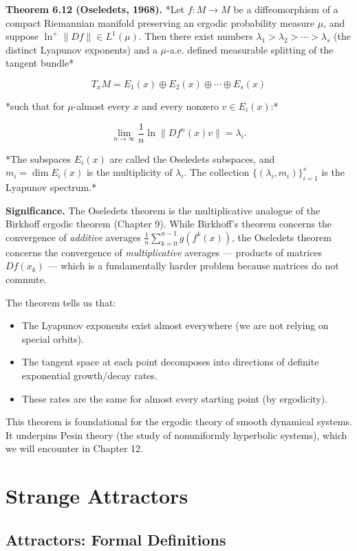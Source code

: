 \textbf{Theorem 6.12 (Oseledets, 1968).} *Let $f: M \to M$ be a diffeomorphism of a compact Riemannian manifold preserving an ergodic probability measure $\mu$, and suppose $\ln^+ \|Df\| \in L^1(\mu)$. Then there exist numbers $\lambda_1 > \lambda_2 > \cdots > \lambda_s$ (the distinct Lyapunov exponents) and a $\mu$-a.e. defined measurable splitting of the tangent bundle*

\[
T_x M = E_1(x) \oplus E_2(x) \oplus \cdots \oplus E_s(x)
\]

*such that for $\mu$-almost every $x$ and every nonzero $v \in E_i(x)$:*

\[
\lim_{n \to \infty} \frac{1}{n} \ln \|Df^n(x) v\| = \lambda_i.
\]

*The subspaces $E_i(x)$ are called the Oseledets subspaces, and $m_i = \dim E_i(x)$ is the multiplicity of $\lambda_i$. The collection $\{(\lambda_i, m_i)\}_{i=1}^s$ is the Lyapunov spectrum.*

\textbf{Significance.} The Oseledets theorem is the multiplicative analogue of the Birkhoff ergodic theorem (Chapter 9). While Birkhoff's theorem concerns the convergence of \textit{additive} averages $\frac{1}{n}\sum_{k=0}^{n-1} g(f^k(x))$, the Oseledets theorem concerns the convergence of \textit{multiplicative} averages --- products of matrices $Df(x_k)$ --- which is a fundamentally harder problem because matrices do not commute.

The theorem tells us that:
\begin{itemize}[nosep]
  \item The Lyapunov exponents exist almost everywhere (we are not relying on special orbits).
  \item The tangent space at each point decomposes into directions of definite exponential growth/decay rates.
  \item These rates are the same for almost every starting point (by ergodicity).
\end{itemize}

This theorem is foundational for the ergodic theory of smooth dynamical systems. It underpins Pesin theory (the study of nonuniformly hyperbolic systems), which we will encounter in Chapter 12.


\bigskip


\section{Strange Attractors}\label{sec:6.4}

\subsection{Attractors: Formal Definitions}\label{sec:6.4.1}

